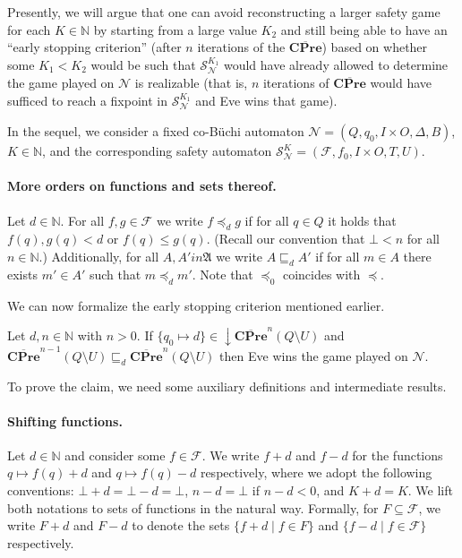 \documentclass[runningheads,a4paper,draft]{llncs}
\newcommand{\cpre}{\mathbf{CPre}}
\newcommand{\calF}{\mathcal{F}}
\newcommand{\calN}{\mathcal{N}}
\newcommand{\calS}{\mathcal{S}}
\newcommand{\frakA}{\mathfrak{A}}
\newcommand{\closedn}[1]{\mathrm{\downarrow} #1}
\begin{document}
Presently, we will argue that one can avoid reconstructing a larger safety
game for each $K \in \mathbb{N}$ by starting from a large value $K_2$ and
still being able to have an ``early stopping criterion'' (after $n$ iterations
of the $\overline{\cpre}$) based on whether some $K_1 < K_2$ would be such
that $\calS^{K_1}_\calN$ would have already allowed to determine the game
played on $\calN$ is realizable (that is, $n$ iterations of $\overline{\cpre}$
would have sufficed to reach a fixpoint in $\calS^{K_1}_\calN$ and Eve wins
that game).

In the sequel, we consider a fixed co-B\"uchi automaton $\calN = (Q,q_0,I
\times O, \Delta,B)$, $K
\in \mathbb{N}$, and the corresponding safety automaton $\calS^K_\calN =
(\calF,f_0,I \times O, T, U)$.

\paragraph{More orders on functions and sets thereof.} Let $d \in \mathbb{N}$.
For all $f,g \in \mathcal{F}$ we write $f \preceq_d g$ if for all $q \in Q$ it
holds that $f(q),g(q) < d$ or $f(q) \leq g(q)$. (Recall our convention that
$\bot < n$ for all $n \in \mathbb{N}$.) Additionally, for all $A,A' in \frakA$
we write $A \sqsubseteq_d A'$ if for all $m \in A$ there exists $m' \in A'$
such that $m \preceq_d m'$. Note that $\preceq_0$ coincides with $\preceq$.

We can now formalize the early stopping criterion mentioned earlier.
\begin{theorem}\label{thm:stop-criterion}
  Let $d,n \in \mathbb{N}$ with $n > 0$.  If $\{q_0 \mapsto d\} \in
  \closedn{\overline{\cpre}^n(Q \setminus U)}$ and
  $\overline{\cpre}^{n-1}(Q\setminus U) \sqsubseteq_d \overline{\cpre}^n(Q
  \setminus U)$ then Eve wins the game played on $\calN$.
\end{theorem}
To prove the claim, we need some auxiliary definitions and intermediate
results.

\paragraph{Shifting functions.} Let $d \in \mathbb{N}$ and consider some $f
\in \calF$. We write $f + d$ and $f - d$ for the functions $q \mapsto f(q) +
d$ and $q \mapsto f(q) - d$ respectively, where we adopt the following
conventions: $\bot + d = \bot - d = \bot$, $n - d = \bot$ if $n - d < 0$, and
$K + d = K$. We lift both notations to sets of functions in the natural way.
Formally, for $F \subseteq \calF$, we write $F + d$ and $F - d$ to denote the
sets $\{f + d \mid f \in F\}$ and $\{f - d \mid f \in \calF\}$ respectively.
\end{document}
